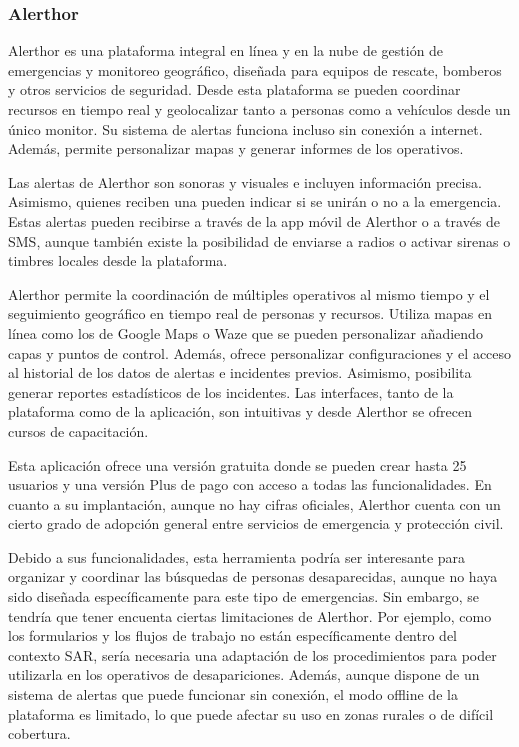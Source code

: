     \subsubsection{Alerthor}
    
    Alerthor es una plataforma integral en línea y en la nube de gestión de emergencias y monitoreo geográfico, diseñada para equipos de rescate, bomberos y otros servicios de seguridad. Desde esta plataforma se pueden coordinar recursos en tiempo real y geolocalizar tanto a personas como a vehículos desde un único monitor. Su sistema de alertas funciona incluso sin conexión a internet. Además, permite personalizar mapas y generar informes de los operativos. \cite{webAlerthor}
    

\vspace{1cm}
    Las alertas de Alerthor son sonoras y visuales e incluyen información precisa. Asimismo, quienes reciben una pueden indicar si se unirán o no a la emergencia. Estas alertas pueden recibirse a través de la app móvil de Alerthor \cite{appAlerthor} o a través de SMS, aunque también existe la posibilidad de enviarse a radios o activar sirenas o timbres locales desde la plataforma. 

    Alerthor permite la coordinación de múltiples operativos al mismo tiempo y el seguimiento geográfico en tiempo real de personas y recursos. Utiliza mapas en línea como los de Google Maps o Waze que se pueden personalizar añadiendo capas y puntos de control. Además, ofrece personalizar configuraciones y el acceso al historial de los datos de alertas e incidentes previos.  Asimismo, posibilita generar reportes estadísticos de los incidentes. Las interfaces, tanto de la plataforma como de la aplicación, son intuitivas y desde Alerthor se ofrecen cursos de capacitación.
    
    Esta aplicación ofrece una versión gratuita donde se pueden crear hasta 25 usuarios y una versión Plus de pago con acceso a todas las funcionalidades. En cuanto a su implantación, aunque no hay cifras oficiales, Alerthor cuenta con un cierto grado de adopción general entre servicios de emergencia y protección civil.
        
    Debido a sus funcionalidades, esta herramienta podría ser interesante para organizar y coordinar las búsquedas de personas desaparecidas, aunque no haya sido diseñada específicamente para este tipo de emergencias. Sin embargo, se tendría que tener encuenta ciertas limitaciones de Alerthor. Por ejemplo, como los formularios y los flujos de trabajo no están específicamente dentro del contexto SAR, sería necesaria una adaptación de los procedimientos para poder utilizarla en los operativos de desapariciones. Además, aunque dispone de un sistema de alertas que puede funcionar sin conexión, el modo offline de la plataforma es limitado, lo que puede afectar su uso en zonas rurales o de difícil cobertura. 
    
